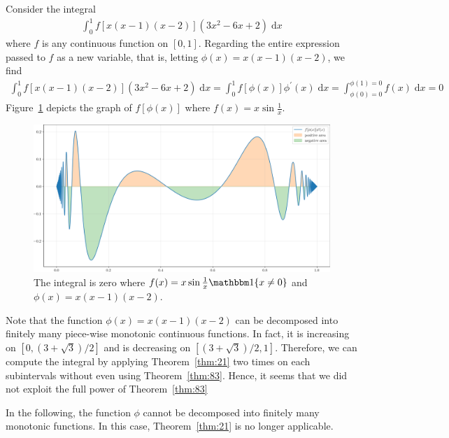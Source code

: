 \documentclass[thmcnt=section, 12pt]{my-elegantbook}
\begin{document}
\begin{example} \label{eg:14}
    Consider the integral
    \begin{align*}
        \int_0^1 f[x(x-1)(x-2)](3x^2 - 6x + 2) \; \mathrm{d} x
    \end{align*}
    where $f$ is any continuous function on $[0, 1]$.
    Regarding the entire expression passed to $f$ as a new variable,
    that is, letting $\phi(x) = x(x-1)(x-2)$,
    we find
    \begin{align*}
        \int_0^1 f[x(x-1)(x-2)](3x^2 - 6x + 2) \; \mathrm{d} x
        = \int_0^1 f[\phi(x)]\phi^\prime(x) \; \mathrm{d} x
        = \int_{\phi(0) = 0}^{\phi(1) = 0}
        f(x) \; \mathrm{d} x
        = 0
    \end{align*}
    Figure~\ref{fig:17} depicts the graph of $f[\phi(x)]$
    where $f(x) = x \sin\frac{1}{x}$.

    \begin{figure}[ht]
        \centering
        \includegraphics[scale=0.5]{figures/ma-017.png}
        \caption{The integral is zero where $f(x) = x \sin\frac{1}{x} \ind\{x \neq 0\}$ and $\phi(x) = x(x-1)(x-2)$.}
        \label{fig:17}
    \end{figure}
\end{example}

Note that the function $\phi(x) = x(x-1)(x-2)$
can be decomposed into finitely many piece-wise monotonic
continuous functions.
In fact, it is increasing on $[0, (3 + \sqrt{3}) / 2]$
and is decreasing on $[(3 + \sqrt{3}) / 2, 1].$
Therefore, we can compute the integral by applying Theorem~\ref{thm:21}
two times on each subintervals without even using Theorem~\ref{thm:83}.
Hence, it seems that we did not
exploit the full power of Theorem~\ref{thm:83}

In the following, the function $\phi$ cannot be
decomposed into finitely many monotonic functions.
In this case, Theorem~\ref{thm:21} is no longer applicable.
\end{document}
